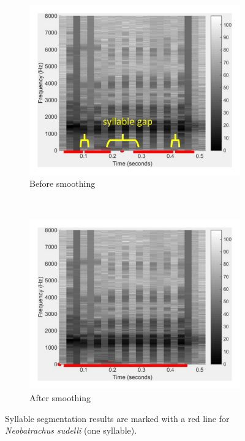 \begin{figure}[htb!]
\centering
        \begin{subfigure}[b]{0.6\linewidth}
                \includegraphics[width=\textwidth]{image/Ch4/no.pdf}
                \caption{Before smoothing}
        \end{subfigure}%
        \\ 
        \begin{subfigure}[b]{0.6\linewidth}
                \includegraphics[width=\textwidth]{image/Ch4/yes.pdf}
                \caption{After smoothing}
        \end{subfigure}
        \caption[Syllable segmentation results]{Syllable segmentation results are marked with a red
line for \textit{Neobatrachus sudelli} (one syllable).}       
        \label{fig:smooth}
\end{figure}



